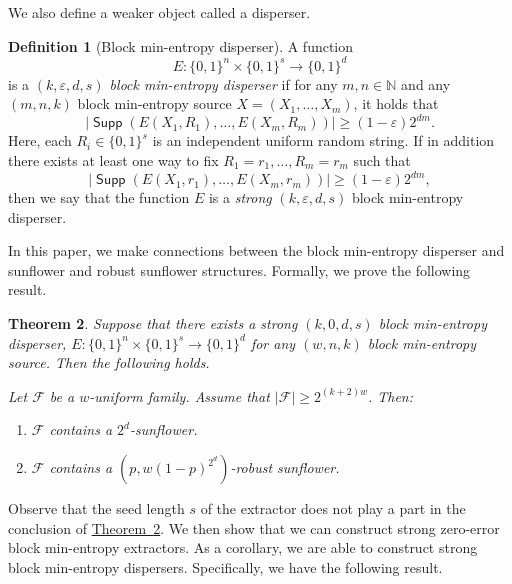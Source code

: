 \documentclass[11pt]{article}
\numberwithin{equation}{section}
\newtheorem{theorem}{Theorem}[section]
\theoremstyle{definition}
\newtheorem{definition}[theorem]{Definition}
\theoremstyle{plain}
\newcommand{\expref}[2]{\hyperref[#2]{#1~\ref{#2}}}
\newcommand{\nnn}{\mathbb{N}}   %
\newcommand{\eps}{\varepsilon}
\newcommand{\calF}{\mathcal{F}} %
\DeclareMathOperator{\Supp}{\mathsf{Supp}}  %
\begin{document}
We also define a weaker object called a disperser.

\begin{definition}[Block min-entropy disperser]
A function
\[ E:\{0,1\}^{n}\times\{0,1\}^{s}\rightarrow\{0,1\}^{d} \]
is a \emph{$(k,\eps,d,s)$ block min-entropy disperser} if for any
$m, n \in \nnn$ and any $(m, n, k)$ block min-entropy source
$X=(X_1, \ldots, X_m)$, it holds that
%
%
\[|\Supp(E(X_1, R_1), \ldots, E(X_m, R_m))| \geq (1-\eps) 2^{dm}. \]
Here, each $R_i \in \{0,1\}^{s}$ is an independent uniform random string.
%
%
If in addition there exists at least one
%
way to fix  %
$R_1=r_1, \ldots, R_m=r_m$  such that
\[ |\Supp(E(X_1, r_1), \ldots, E(X_m, r_m))| \geq (1-\eps) 2^{dm}, \] 
then we say that the function $E$ is a \emph{strong} $(k,\eps,d,s)$
block min-entropy disperser.
\end{definition}

In this paper, we make connections between the block min-entropy disperser and
sunflower and robust sunflower structures. Formally, we prove the following
%
result.   %


\begin{theorem}\label{thm:main}
Suppose that there exists a strong $(k,0,d,s)$ block min-entropy disperser,
$E:\{0,1\}^{n}\times\{0,1\}^{s}\rightarrow\{0,1\}^{d}$ for any $(w, n, k)$ block min-entropy source.
Then the following holds.

Let $\calF$ be a %
$w$-uniform family.  %
Assume that $|\calF| \geq 2^{(k+2) w}$. Then:
\begin{enumerate}
\item[(i)] $\calF$ contains a $2^d$-sunflower.
\item[(ii)] $\calF$ contains a $\left(p, w (1-p)^{2^{d}}\right)$-robust sunflower.
\end{enumerate}
\end{theorem}


Observe that the seed length $s$ of the extractor does not play a part in the conclusion of \expref{Theorem}{thm:main}. We then show that we can
construct strong zero-error block min-entropy extractors. As a corollary, we are able to construct strong block min-entropy dispersers. Specifically, we have the following %
result.   %
\end{document}
